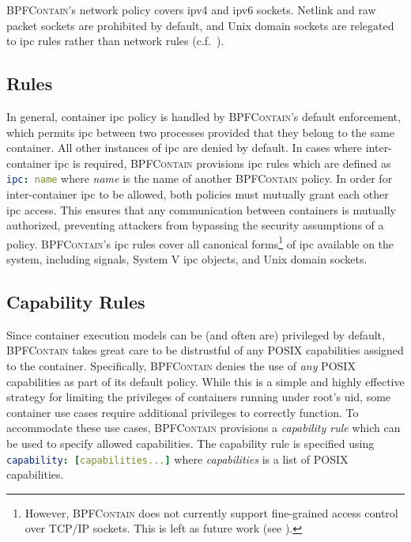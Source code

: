 \documentclass[
  fontsize=12pt,
  titlepage=firstiscover,
  paper=letter,
oneside,
  cleardoublepage=plain,
  parskip=half-,
  DIV=10,
  parindent,
  appendixprefix,
  chapterprefix,
  listof=totoc,
]{scrbook}
\newcommand{\bpfcontain}{\textsc{BPFContain}}
\begin{document}
\bpfcontain{}'s network policy covers \gls{ip}v4 and \gls{ip}v6 sockets. Netlink and raw
packet sockets are prohibited by default, and Unix domain sockets are relegated to
\gls{ipc} rules rather than network rules (c.f.\ ).

\subsection{ Rules}\label{ss:bpfcontain-ipc}

In general, container \gls{ipc} policy is handled by \bpfcontain{}'s default enforcement,
which permits \gls{ipc} between two processes provided that they belong to the same
container. All other instances of \gls{ipc} are denied by default. In cases where
inter-container \gls{ipc} is required, \bpfcontain{} provisions \gls{ipc} rules which are
defined as \lstinline[language=yaml]|ipc: name| where \textit{name} is the name of another
\bpfcontain{} policy. In order for inter-container \gls{ipc} to be allowed, both policies
must mutually grant each other \gls{ipc} access. This ensures that any communication
between containers is mutually authorized, preventing attackers from bypassing the
security assumptions of a policy. \bpfcontain{}'s \gls{ipc} rules cover all canonical
forms\footnote{However, \bpfcontain{} does not currently support fine-grained access
control over TCP/IP sockets. This is left as future work (see ).}
of \gls{ipc} available on the system, including signals, System V \gls{ipc} objects, and
Unix domain sockets.

\subsection{Capability Rules}

Since container execution models can be (and often are) privileged by default,
\bpfcontain{} takes great care to be distrustful of any POSIX capabilities assigned to the
container. Specifically, \bpfcontain{} denies the use of \textit{any} POSIX capabilities
as part of its default policy. While this is a simple and highly effective strategy for
limiting the privileges of containers running under root's \gls{uid}, some container use
cases require additional privileges to correctly function. To accommodate these use cases,
\bpfcontain{} provisions a \textit{capability rule} which can be used to specify allowed
capabilities. The capability rule is specified using \lstinline[language=yaml]|capability: [capabilities...]|
where \textit{capabilities} is a list of POSIX capabilities.
\end{document}
